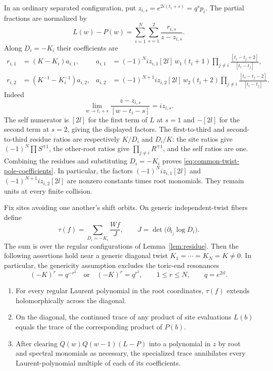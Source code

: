 In an ordinary separated configuration, put
$z_{i,s}=e^{2i(t_i+s)}=q^sp_i$. The partial fractions are normalized by
\[
 L(w)-P(w)=\sum_{i=1}^N\sum_{s=1}^2
                 \frac{r_{i,s}}{z-z_{i,s}}.
\]
Along $D_i=-K_i$ their coefficients are
\begin{equation}\label{eq:common-twist-pole-coefficients}
\begin{aligned}
 r_{i,1}&=(K-K_i)a_{i,1},
 &a_{i,1}&=(-1)^N i z_{i,1}[2l]\,w_1(t_i+1)
       \prod_{j\ne i}\frac{[t_i-t_j+2]}{[t_i-t_j]},\\
 r_{i,2}&=(K^{-1}-K_i^{-1})a_{i,2},
 &a_{i,2}&=(-1)^{N+1} i z_{i,2}[2l]\,w_2(t_i+2)
       \prod_{j\ne i}\frac{[t_i-t_j-2]}{[t_i-t_j]}.
\end{aligned}
\end{equation}
Indeed
\[
 \lim_{w\to t_i+s}\frac{z-z_{i,s}}{[w-t_i-s]}=i z_{i,s}.
\]
The self numerator is \([2l]\) for the first term of \(L\) at
$s=1$ and \(-[2l]\) for the second term at $s=2$, giving the
displayed factors. The first-to-third and second-to-third residue
ratios are respectively \(K/D_i\) and \(D_i/K\): the site ratios
give \((-1)^N\prod S^{\mp1}\), the other-root ratios give
\(\prod_{j\ne i}R^{\mp1}\), and the self ratios are one.
Combining the residues and substituting \(D_i=-K_i\) proves
\eqref{eq:common-twist-pole-coefficients}. In particular, the factors
\((-1)^N i z_{i,1}[2l]\) and \((-1)^{N+1}i z_{i,2}[2l]\)
are nonzero constants times root monomials. They remain units at
every finite collision.

\begin{samepage}
\begin{proposition}\label{prop:common-twist}
Fix sites avoiding one another's shift orbits. On generic independent-twist fibers define
\begin{equation}\label{eq:common-twist-trace}
 \tau(f)=\sum_{D_i=-K_i}\frac{Wf}{J},
 \qquad J=\det\bigl(\partial_{t_j}\log D_i\bigr).
\end{equation}
The sum is over the regular configurations of Lemma~\ref{lem:residue}. Then the following assertions hold near a generic diagonal twist $K_1=\cdots=K_N=K\ne0$. In particular, the genericity assumption excludes the toric-end resonances
\begin{equation}\label{eq:common-twist-resonances}
 (-K)^r=q^{-r^2}\quad\text{or}\quad(-K)^r=q^{r^2},
 \qquad 1\le r\le N,\qquad q=e^{2il}.
\end{equation}
\begin{enumerate}
\item For every regular Laurent polynomial in the root coordinates, $\tau(f)$ extends holomorphically across the diagonal.
\item On the diagonal, the continued trace of any product of site evaluations $L(b)$ equals the trace of the corresponding product of $P(b)$.
\item After clearing $Q(w)Q(w-1)(L-P)$ into a polynomial in $z$ by root and spectral monomials as necessary, the specialized trace annihilates every Laurent-polynomial multiple of each of its coefficients.
\end{enumerate}
\end{proposition}
\end{samepage}


